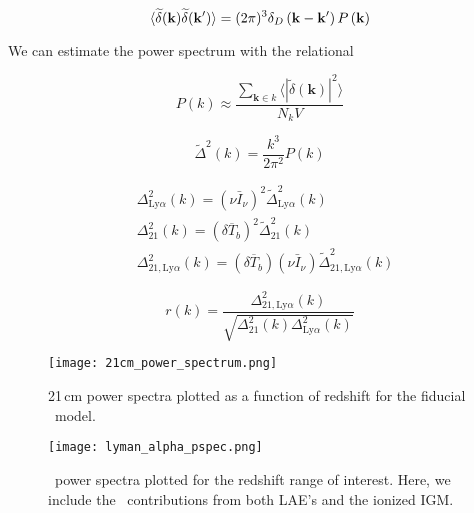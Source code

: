 \begin{equation}
\langle \widetilde{\delta} ({\bf k}) \widetilde{\delta} ({\bf k'}) \rangle = (2 \pi) ^3 \delta_D \left( {\bf k} - {\bf k'} \right) P \left({\bf k} \right)
\end{equation}

We can estimate the power spectrum with the relational

\begin{equation}
P\left( k\right) \approx \frac{\sum_{\textbf{k} \in k}\langle | \widetilde{\delta} \left( \textbf{k}\right) |^2 \rangle}{N_k V}
\end{equation}

\begin{equation}
    \widetilde{\Delta}^2 \left( k \right) = \frac{k^3}{2 \pi ^2} P \left( k \right)
\end{equation}

\begin{align}
    &\Delta^2_{\textrm{Ly} \alpha} \left( k \right) = \left( \nu \bar{I}_{\nu} \right)^2 \widetilde{\Delta}^2_{\textrm{Ly} \alpha} \left( k \right) \\
    &\Delta^2_{21}\left( k \right) = \left(\delta \overline{T}_b \right)^2 \widetilde{\Delta}^2_{21} \left( k \right) \\
    &\Delta^2_{21, \textrm{Ly} \alpha} \left( k \right) = \left(\delta \overline{T}_b \right) \left( \nu \bar{I}_{\nu} \right) \widetilde{\Delta}^2_{21, \textrm{Ly} \alpha} \left( k \right)
\end{align}

\begin{equation}
  r \left(k \right) = \frac{\Delta^2_{21, \textrm{Ly} \alpha}\left(k \right)}
                           {\sqrt{\Delta^2_{21} \left(k \right)\Delta^2_{\textrm{Ly} \alpha} \left(k \right)}}
\end{equation}

\begin{figure}[ht]
	\centering
	\texttt{[image: 21cm\_power\_spectrum.png]}
	\caption[21\,cm Power Spectrum]{21\,cm power spectra plotted as a function of redshift for the fiducial \fastsim\
           model.}
	\label{fig:21cm_ps}
\end{figure}

\begin{figure}[ht]
	\centering
	\texttt{[image: lyman\_alpha\_pspec.png]}
	\caption[\lya\ Power Spectrum]{\lya\ power spectra plotted for the redshift range of interest. Here, we include
           the \lya\ contributions from both LAE's and the ionized IGM.}
	\label{fig:lya_ps}
\end{figure}

